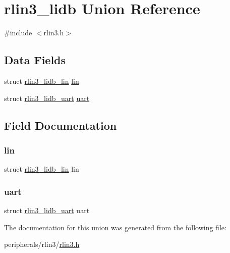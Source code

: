 \hypertarget{unionrlin3__lidb}{}\section{rlin3\+\_\+lidb Union Reference}
\label{unionrlin3__lidb}


{\ttfamily \#include $<$rlin3.\+h$>$}

\subsection*{Data Fields}
\begin{DoxyCompactItemize}
\item 
struct \mbox{\hyperlink{structrlin3__lidb__lin}{rlin3\+\_\+lidb\+\_\+lin}} \mbox{\hyperlink{unionrlin3__lidb_a6d3e64937f8de375248a7ee1812140a6}{lin}}
\item 
struct \mbox{\hyperlink{structrlin3__lidb__uart}{rlin3\+\_\+lidb\+\_\+uart}} \mbox{\hyperlink{unionrlin3__lidb_aed9534accc7e38c0b79c188a1da22554}{uart}}
\end{DoxyCompactItemize}


\subsection{Field Documentation}
\mbox{\label{unionrlin3__lidb_a6d3e64937f8de375248a7ee1812140a6}} 
\subsubsection{\texorpdfstring{lin}{lin}}
{\footnotesize\ttfamily struct \mbox{\hyperlink{structrlin3__lidb__lin}{rlin3\+\_\+lidb\+\_\+lin}} lin}

\mbox{\label{unionrlin3__lidb_aed9534accc7e38c0b79c188a1da22554}} 
\subsubsection{\texorpdfstring{uart}{uart}}
{\footnotesize\ttfamily struct \mbox{\hyperlink{structrlin3__lidb__uart}{rlin3\+\_\+lidb\+\_\+uart}} uart}



The documentation for this union was generated from the following file\+:\begin{DoxyCompactItemize}
\item 
peripherals/rlin3/\mbox{\hyperlink{rlin3_8h}{rlin3.\+h}}\end{DoxyCompactItemize}
